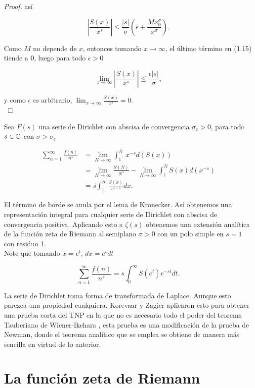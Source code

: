 \begin{proof}
así

\begin{equation}
\left|\frac{S(x)}{x^s}\right| \leq \frac{|s|}{\sigma}\left(\epsilon+\frac{M x_0^{\sigma}}{x^{\sigma}}\right).
\end{equation}

Como $M$ no depende de $x$, entonces tomando $x\to\infty$, el último término en (1.15) tiende a 0, luego para todo $\epsilon>0$

$$\lim_{x \to \infty}\left|\frac{S(x)}{x^s}\right|\leq \frac{\epsilon|s|}{\sigma},$$

y como $\epsilon$ es arbitrario, $\displaystyle\lim_{x \to \infty} \frac{S(x)}{x^s}=0$.\\
\end{proof}

Sea $F(s)$ una serie de Dirichlet con abscisa de convergencia $\sigma_c>0$, para todo $s\in \mathbb{C}$ con $\sigma>\sigma_c$

\begin{align*}
\sum_{n=1}^{\infty}\frac{f(n)}{n^s}&=\lim_{N \to \infty} \int_{1^{-}}^N x^{-s}d(S(x))\\
&=\lim_{N \to \infty}\frac{S(N)}{N^s}-\lim_{N \to \infty} \int_1^N S(x)d(x^{-s})\\
&=s\int_1^{\infty} \frac{S(x)}{x^{s+1}}dx.
\end{align*}

El término de borde se anula por el lema de Kronecker. Así obtenemos una representación integral para cualquier serie de Dirichlet con abscisa de convergencia positiva. Aplicando esto a $\zeta(s)$  obtenemos una extensión analítica de la función zeta de Riemann al semiplano $\sigma>0$ con un polo simple en $s=1$ con residuo 1.\\

Note que tomando $x=e^t$, $dx=e^tdt$

$$\sum_{n=1}^{\infty} \frac{f(n)}{n^s}=s\int_0^{\infty}S(e^{t})e^{-st}dt.$$

La serie de Dirichlet toma forma de transformada de Laplace. Aunque esto parezca una propiedad cualquiera, Korevaar y Zagier aplicaron esto para obtener una prueba corta del TNP en la que no es necesario todo el poder del teorema Tauberiano de Wiener-Ikehara \cite{zagier1997newman}, esta prueba es una modificación de la prueba de Newman\cite{newman1980simple}, donde el teorema analítico que se emplea se obtiene de manera más sencilla en virtud de lo anterior.

\section{La función zeta de Riemann}

